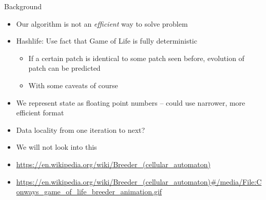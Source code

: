 \begin{frame}{Background}

  \begin{itemize}
  \item Our algorithm is not an \emph{efficient} way to solve problem
  \item Hashlife: Use fact that Game of Life is fully deterministic
    \begin{itemize}
    \item If a certain patch is identical to some patch seen before, evolution of patch can be predicted
    \item With some caveats of course
    \end{itemize}
  \item We represent state as floating point numbers -- could use narrower, more efficient format
  \item Data locality from one iteration to next?
  \item We will not look into this
  \item \url{https://en.wikipedia.org/wiki/Breeder_(cellular_automaton)}
    \item \url{https://en.wikipedia.org/wiki/Breeder_(cellular_automaton)\#/media/File:Conways_game_of_life_breeder_animation.gif}
  \end{itemize}

\end{frame}

